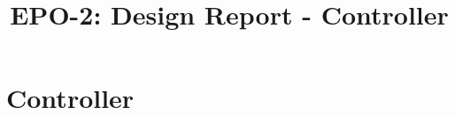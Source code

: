 \documentclass{report}
\title{EPO-2: Design Report - Controller}
\author{}
\begin{document}
\chapter{Controller}
\label{ch:controller}
\end{document}
